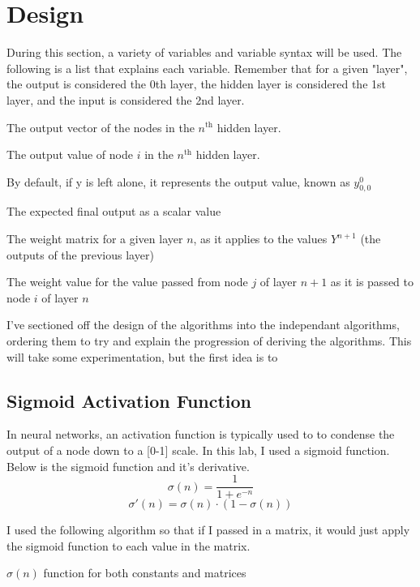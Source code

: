 \documentclass[10pt]{article}
\begin{document}
\section{Design}
During this section, a variety of variables and variable syntax will be used. The following is a list that explains each variable. Remember that for a given "layer", the output is considered the 0th layer, the hidden layer is considered the 1st layer, and the input is considered the 2nd layer.
\begin{description}[style=nextline]
    \item[$y^n$] The output vector of the nodes in the $n^{\text{th}}$ hidden layer. 
    \item[$y^n_{i,0}$] The output value of node $i$ in the $n^{\text{th}}$ hidden layer.
    \item[$y$] By default, if y is left alone, it represents the output value, known as $y^0_{0,0}$ 
    \item[$\hat{y}$] The expected final output as a scalar value
    \item[$W^n$] The weight matrix for a given layer $n$, as it applies to the values $Y^{n+1}$ (the outputs of the previous layer) 
    \item[$w^n_{i,j}$] The weight value for the value passed from node $j$ of layer $n+1$ as it is passed to node $i$ of layer $n$
\end{description}

I've sectioned off the design of the algorithms into the independant algorithms, ordering them to try and explain the progression of deriving the algorithms. 
This will take some experimentation, but the first idea is to 
\subsection{Sigmoid Activation Function}
In neural networks, an activation function is typically used to to condense the output of a node down to a [0-1] scale. In this lab, I used a sigmoid function. Below is the sigmoid function and it's derivative.
$$\sigma(n) = \frac{1}{1 + e^{-n}}$$
$$\sigma'(n) = \sigma(n) \cdot (1 - \sigma(n))$$

I used the following algorithm so that if I passed in a matrix, it would just apply the sigmoid function to each value in the matrix.

\begin{algorithm}[H]
    \caption{$\sigma(n)$ function for both constants and matrices}
\end{algorithm}
\end{document}
